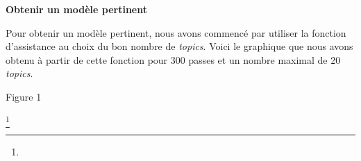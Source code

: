 \documentclass[letterpaper,portrait,12pt]{article}
\begin{document}
	\textbf{Obtenir un mod\`{e}le pertinent}





	Pour obtenir un mod\`{e}le pertinent, nous avons commenc\'{e} par utiliser la fonction d'assistance au choix du bon nombre de \emph{topics}. Voici le graphique que nous avons obtenu \`{a} partir de cette fonction pour 300 passes et un nombre maximal de 20 \emph{topics}.











Figure 1


\footnote{} 
\end{document}
